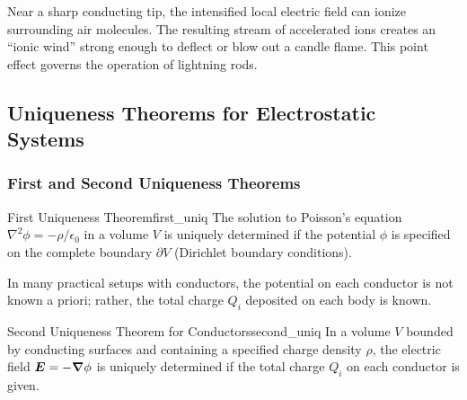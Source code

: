\begin{remark}
    Near a sharp conducting tip, the intensified local electric field can ionize surrounding air molecules. The resulting stream of accelerated ions creates an ``ionic wind'' strong enough to deflect or blow out a candle flame. This point effect governs the operation of lightning rods.
\end{remark}

\subsection{Uniqueness Theorems for Electrostatic Systems}

\subsubsection{First and Second Uniqueness Theorems}

\begin{theorem}{First Uniqueness Theorem}{first_uniq}
    The solution to Poisson's equation \(\nabla^2 \phi = -\rho / \epsilon_0\) in a volume \(V\) is uniquely determined if the potential \(\phi\) is specified on the complete boundary \(\partial V\) (Dirichlet boundary conditions).
\end{theorem}

In many practical setups with conductors, the potential on each conductor is not known a priori; rather, the total charge \(Q_i\) deposited on each body is known.

\begin{theorem}{Second Uniqueness Theorem for Conductors}{second_uniq}
    In a volume \(V\) bounded by conducting surfaces and containing a specified charge density \(\rho\), the electric field \(\bm{E} = -\grad\phi\) is uniquely determined if the total charge \(Q_i\) on each conductor is given.
\end{theorem}

